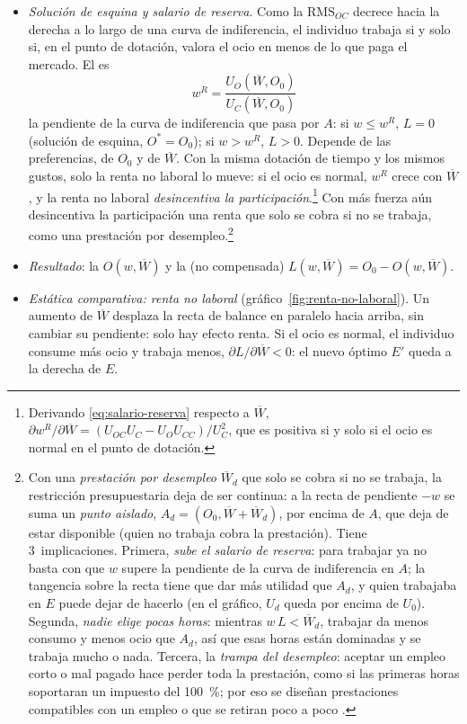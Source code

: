 \documentclass[11pt]{article}
\begin{document}
\begin{itemize}
\item \emph{Solución de esquina y salario de reserva}. Como la $\mathrm{RMS}_{OC}$ decrece hacia la derecha a lo largo de una curva de indiferencia, el individuo trabaja si y solo si, en el punto de dotación, valora el ocio en menos de lo que paga el mercado. El  es
  \begin{equation}
  w^R=\frac{U_O(\overline{W},O_0)}{U_C(\overline{W},O_0)}\label{eq:salario-reserva}
  \end{equation}
  la pendiente de la curva de indiferencia que pasa por $A$: si $w\leq w^R$, $L=0$ (solución de esquina, $O^*=O_0$); si $w>w^R$, $L>0$. Depende de las preferencias, de $O_0$ y de $\overline{W}$. Con la misma dotación de tiempo y los mismos gustos, solo la renta no laboral lo mueve: si el ocio es normal, $w^R$ crece con $\overline{W}$, y la renta no laboral \emph{desincentiva la participación}.\footnote{Derivando \eqref{eq:salario-reserva} respecto a $\overline{W}$, $\partial w^R/\partial\overline{W}=(U_{OC}U_C-U_OU_{CC})/U_C^2$, que es positiva si y solo si el ocio es normal en el punto de dotación\nocite{Cahuc2014Labor}.} Con más fuerza aún desincentiva la participación una renta que solo se cobra si no se trabaja, como una prestación por desempleo.\footnote{Con una \emph{prestación por desempleo} $\overline{W}_d$ que solo se cobra si no se trabaja, la restricción presupuestaria deja de ser continua: a la recta de pendiente $-w$ se suma un \emph{punto aislado}, $A_d=(O_0,\overline{W}+\overline{W}_d)$, por encima de $A$, que deja de estar disponible (quien no trabaja cobra la prestación). Tiene 3~implicaciones. Primera, \emph{sube el salario de reserva}: para trabajar ya no basta con que $w$ supere la pendiente de la curva de indiferencia en $A$; la tangencia sobre la recta tiene que dar más utilidad que $A_d$, y quien trabajaba en $E$ puede dejar de hacerlo (en el gráfico, $U_d$ queda por encima de $U_0$). Segunda, \emph{nadie elige pocas horas}: mientras $w\,L<\overline{W}_d$, trabajar da menos consumo y menos ocio que $A_d$, así que esas horas están dominadas y se trabaja mucho o nada. Tercera, la \emph{trampa del desempleo}: aceptar un empleo corto o mal pagado hace perder toda la prestación, como si las primeras horas soportaran un impuesto del 100~\%; por eso se diseñan prestaciones compatibles con un empleo o que se retiran poco a poco .}
\item \emph{Resultado}: la  $O(w,\overline{W})$ y la  (no compensada) $L(w,\overline{W})=O_0-O(w,\overline{W})$.
\item \emph{Estática comparativa: renta no laboral} (gráfico~\ref{fig:renta-no-laboral}). Un aumento de $\overline{W}$ desplaza la recta de balance en paralelo hacia arriba, sin cambiar su pendiente: solo hay efecto renta. Si el ocio es normal, el individuo consume más ocio y trabaja menos, $\partial L/\partial\overline{W}<0$: el nuevo óptimo $E'$ queda a la derecha de $E$.
\end{itemize}
\end{document}
